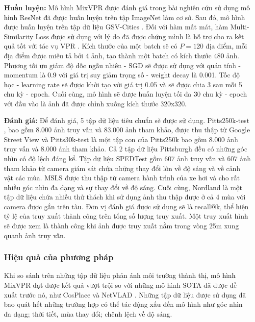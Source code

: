 \textbf{Huấn luyện:} Mô hình MixVPR được đánh giá trong bài nghiên cứu sử dụng mô hình ResNet \cite{he2016deep} đã được huấn luyện trên tập ImageNet \cite{krizhevsky2012imagenet} làm cơ sở. Sau đó, mô hình được huấn luyện trên tập dữ liệu GSV-Cities \cite{Ali_bey_2022}. Đối với hàm mất mát, hàm Multi-Similarity Loss \cite{wang2019multi} được sử dụng với lý do đã được chứng mình là hỗ trợ cho ra kết quả tốt với tác vụ VPR \cite{Ali_bey_2022}. Kích thước của một batch sẽ có $P = 120$ địa điểm, mỗi địa điểm được miêu tả bởi 4 ảnh, tạo thành một batch có kích thước 480 ảnh. Phương tối ưu giảm độ dốc ngẫu nhiên - SGD sẽ được sử dụng với quán tính - momentum là 0.9 với giá trị suy giảm trọng số - weight decay là 0.001. Tốc độ học - learning rate sẽ được khởi tạo với giá trị 0.05 và sẽ được chia 3 sau mỗi 5 chu kỳ - epoch. Cuối cùng, mô hình sẽ được huấn luyện tối đa 30 chu kỳ - epoch với đầu vào là ảnh đã được chỉnh xuống kích thước 320x320.

\textbf{Đánh giá:} Để đánh giá, 5 tập dữ liệu tiêu chuẩn sẽ được sử dụng. Pitts250k-test \cite{6618963}, bao gồm 8.000 ảnh truy vấn và 83.000 ảnh tham khảo, được thu thập từ Google Street View và Pitts30k-test \cite{6618963} là một tập con của Pitts250k bao gồm 8.000 ảnh truy vấn và 8.000 ảnh tham khảo. Cả 2 tập dữ liệu Pittsburgh đều có những góc nhìn có độ lệch đáng kể. Tập dữ liệu SPEDTest \cite{zaffar2021vpr} gồm 607 ảnh truy vấn và 607 ảnh tham khảo từ camera giám sát chứa những thay đổi lớn về độ sáng và về cảnh vật các mùa. MSLS \cite{warburg2020mapillary} được thu thập từ camera hành trình của xe hơi và cho rất nhiều góc nhìn đa dạng và sự thay đổi về độ sáng. Cuối cùng, Nordland \cite{zaffar2021vpr} là một tập dữ liệu chứa nhiều thử thách khi sử dụng ảnh thu thập được ở cả 4 mùa với camera được gắn trên tàu. Đơn vị đánh giá được sử dụng sẽ là recall@k, thể hiện tỷ lệ của truy xuất thành công trên tổng số lượng truy xuất. Một truy xuất hình sẽ được xem là thành công khi ảnh được truy xuất nằm trong vòng 25m xung quanh ảnh truy vấn.

\subsubsection*{Hiệu quả của phương pháp}
Khi so sánh trên những tập dữ liệu phản ánh môi trường thành thị, mô hình MixVPR đạt được kết quả vượt trội so với những mô hình SOTA đã được đề xuất trước nó, như CosPlace \cite{berton2022rethinking} và NetVLAD \cite{arandjelovic2016netvlad}. Những tập dữ liệu được sử dụng đã bao quát hết những trường hợp có thể tác động xấu đến mô hình như góc nhìn đa dạng; thời tiết, mùa thay đổi; chênh lệch về độ sáng.

